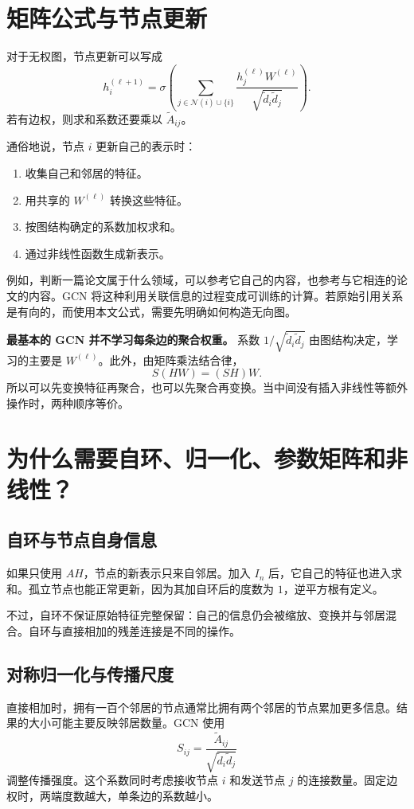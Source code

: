 \documentclass[UTF8,a4paper,11pt,fontset=fandol]{ctexart}
\begin{document}
\section{矩阵公式与节点更新}
对于无权图，节点更新可以写成
\begin{equation}
\boxed{
h_i^{(\ell+1)}=\sigma\!\left(
\sum_{j\in\mathcal N(i)\cup\{i\}}
\frac{h_j^{(\ell)}W^{(\ell)}}{\sqrt{\widetilde d_i\widetilde d_j}}
\right).
}
\label{eq:node}
\end{equation}
若有边权，则求和系数还要乘以 $\widetilde A_{ij}$。

通俗地说，节点 $i$ 更新自己的表示时：
\begin{enumerate}
\item 收集自己和邻居的特征。
\item 用共享的 $W^{(\ell)}$ 转换这些特征。
\item 按图结构确定的系数加权求和。
\item 通过非线性函数生成新表示。
\end{enumerate}
例如，判断一篇论文属于什么领域，可以参考它自己的内容，也参考与它相连的论文的内容。GCN 将这种利用关联信息的过程变成可训练的计算。若原始引用关系是有向的，而使用本文公式，需要先明确如何构造无向图。

\textbf{最基本的 GCN 并不学习每条边的聚合权重。} 系数 $1/\sqrt{\widetilde d_i\widetilde d_j}$ 由图结构决定，学习的主要是 $W^{(\ell)}$。此外，由矩阵乘法结合律，
\begin{equation}
S(HW)=(SH)W.
\end{equation}
所以可以先变换特征再聚合，也可以先聚合再变换。当中间没有插入非线性等额外操作时，两种顺序等价。

\section{为什么需要自环、归一化、参数矩阵和非线性？}
\subsection{自环与节点自身信息}
如果只使用 $AH$，节点的新表示只来自邻居。加入 $I_n$ 后，它自己的特征也进入求和。孤立节点也能正常更新，因为其加自环后的度数为 $1$，逆平方根有定义。

不过，自环不保证原始特征完整保留：自己的信息仍会被缩放、变换并与邻居混合。自环与直接相加的残差连接是不同的操作。

\subsection{对称归一化与传播尺度}
直接相加时，拥有一百个邻居的节点通常比拥有两个邻居的节点累加更多信息。结果的大小可能主要反映邻居数量。GCN 使用
\begin{equation}
S_{ij}=\frac{\widetilde A_{ij}}{\sqrt{\widetilde d_i\widetilde d_j}}
\end{equation}
调整传播强度。这个系数同时考虑接收节点 $i$ 和发送节点 $j$ 的连接数量。固定边权时，两端度数越大，单条边的系数越小。
\end{document}
